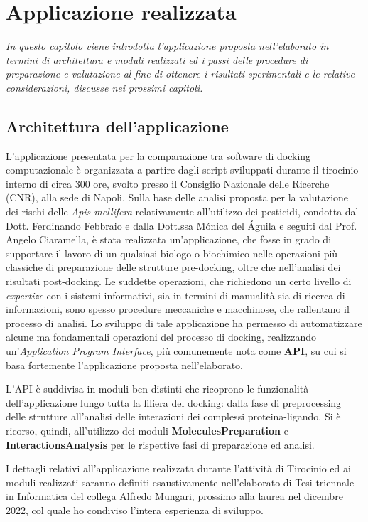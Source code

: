 \chapter{Applicazione realizzata}

\textit{In questo capitolo viene introdotta l'applicazione proposta nell'elaborato in termini di architettura e moduli realizzati ed i passi delle procedure di preparazione e valutazione al fine di ottenere i risultati sperimentali e le relative considerazioni, discusse nei prossimi capitoli. }

\section{Architettura dell'applicazione}
L'applicazione presentata per la comparazione tra software di docking computazionale è organizzata a partire dagli script sviluppati durante il tirocinio interno di circa 300 ore, svolto presso il Consiglio Nazionale delle Ricerche (CNR), alla sede di Napoli.
Sulla base delle analisi proposta per la valutazione dei rischi delle \textit{Apis mellifera} relativamente all'utilizzo dei pesticidi, condotta dal Dott. Ferdinando Febbraio e dalla Dott.ssa Mónica del Águila e seguiti dal Prof. Angelo Ciaramella, è stata realizzata un'applicazione, che fosse in grado di supportare il lavoro di un qualsiasi biologo o biochimico nelle operazioni più classiche di preparazione delle strutture pre-docking, oltre che nell'analisi dei risultati post-docking. Le suddette operazioni, che richiedono un certo livello di \textit{expertize} con i sistemi informativi, sia in termini di manualità sia di ricerca di informazioni, sono spesso procedure meccaniche e macchinose, che rallentano il processo di analisi. Lo sviluppo di tale applicazione ha permesso di automatizzare alcune ma fondamentali operazioni del processo di docking, realizzando un'\textit{Application Program Interface}, più comunemente nota come \textbf{API}, su cui si basa fortemente l'applicazione proposta nell'elaborato. 

L'API è suddivisa in moduli ben distinti che ricoprono le funzionalità dell'applicazione lungo tutta la filiera del docking: dalla fase di preprocessing delle strutture all'analisi delle interazioni dei complessi proteina-ligando. Si è ricorso, quindi, all'utilizzo dei moduli \textbf{MoleculesPreparation} e \textbf{InteractionsAnalysis} per le rispettive fasi di preparazione ed analisi.

I dettagli relativi all'applicazione realizzata durante l'attività di Tirocinio ed ai moduli realizzati saranno definiti esaustivamente nell'elaborato di Tesi triennale in Informatica del collega Alfredo Mungari, prossimo alla laurea nel dicembre 2022, col quale ho condiviso l'intera esperienza di sviluppo.

